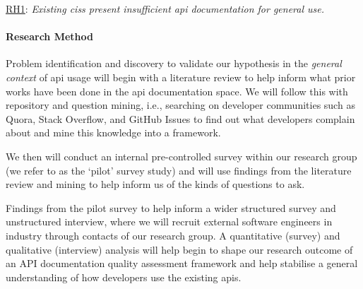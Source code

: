 \begin{titled-frame}{\underline{RH1}: \textit{Existing \glspl{cis} present insufficient \gls{api} documentation for general use.} }
\paragraph{Research Method}

Problem identification and discovery to validate our hypothesis in the \textit{general context} of \gls{api} usage will begin with a literature review to help inform what prior works have been done in the \gls{api} documentation space. We will follow this with repository and question mining, i.e., searching on developer communities such as Quora, Stack Overflow, and GitHub Issues to find out what developers complain about and mine this knowledge into a framework.

We then will conduct an internal pre-controlled survey within our research group (we refer to as the `pilot' survey study) and will use findings from the literature review and mining to help inform us of the kinds of questions to ask. 

Findings from the pilot survey to help inform a wider structured survey and unstructured interview, where we will recruit external software engineers in industry through contacts of our research group. A quantitative (survey) and qualitative (interview) analysis will help begin to shape our research outcome of an API documentation quality assessment framework and help stabilise a general understanding of how developers use the existing \glspl{api}.
\end{titled-frame}

